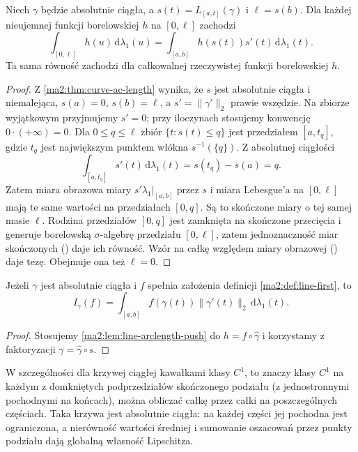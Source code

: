 \begin{lemat}
\label{ma2:lem:line-arclength-push}
Niech $\gamma$ będzie absolutnie ciągła,
a $s(t)=L_{[a,t]}(\gamma)$ i $\ell=s(b)$.
Dla każdej nieujemnej funkcji borelowskiej $h$
na $[0,\ell]$ zachodzi
\[
 \int_{[0,\ell]}h(u)\,\mathrm d\lambda_1(u)
 =\int_{[a,b]}h(s(t))s'(t)\,\mathrm d\lambda_1(t).
\]
Ta sama równość zachodzi dla całkowalnej
rzeczywistej funkcji borelowskiej $h$.
\end{lemat}
\begin{proof}
Z \ref{ma2:thm:curve-ac-length} wynika, że
$s$ jest absolutnie ciągła i niemalejąca,
$s(a)=0$, $s(b)=\ell$, a
$s'=\|\gamma'\|_2$ prawie wszędzie.
Na zbiorze wyjątkowym przyjmujemy $s'=0$;
przy iloczynach stosujemy konwencję
$0\cdot(+\infty)=0$.
Dla $0\le q\le\ell$ zbiór
$\{t:s(t)\le q\}$ jest przedziałem $[a,t_q]$,
gdzie $t_q$ jest największym punktem włókna
$s^{-1}(\{q\})$. Z absolutnej ciągłości
\[
 \int_{[a,t_q]}s'(t)\,\mathrm d\lambda_1(t)
 =s(t_q)-s(a)=q.
\]
Zatem miara obrazowa miary
$s'\lambda_1|_{[a,b]}$ przez $s$
i miara Lebesgue'a na $[0,\ell]$ mają te same
wartości na przedziałach $[0,q]$.
Są to skończone miary o tej samej masie $\ell$.
Rodzina przedziałów $[0,q]$ jest zamknięta
na skończone przecięcia i generuje borelowską
$\sigma$-algebrę przedziału $[0,\ell]$, zatem
jednoznaczność miar skończonych
()
daje ich równość. Wzór na całkę względem
miary obrazowej
()
daje tezę. Obejmuje ona też $\ell=0$.
\end{proof}

\begin{wniosek}
\label{ma2:cor:line-first-speed}
Jeżeli $\gamma$ jest absolutnie ciągła i $f$
spełnia założenia definicji \ref{ma2:def:line-first}, to
\[
 I_\gamma(f)=\int_{[a,b]} f(\gamma(t))
 \|\gamma'(t)\|_2\,\mathrm d\lambda_1(t).
\]
\end{wniosek}
\begin{proof}
Stosujemy \ref{ma2:lem:line-arclength-push}
do $h=f\circ\widehat\gamma$ i korzystamy
z faktoryzacji $\gamma=\widehat\gamma\circ s$.
\end{proof}
W szczególności dla krzywej ciągłej kawałkami
klasy $C^1$, to znaczy klasy $C^1$ na każdym
z domkniętych podprzedziałów skończonego podziału
(z jednostronnymi pochodnymi na końcach), można
obliczać całkę przez całki na poszczególnych
częściach. Taka krzywa jest absolutnie ciągła:
na każdej części jej pochodna jest ograniczona,
a nierówność wartości średniej i sumowanie
oszacowań przez punkty podziału dają globalną
własność Lipschitza.

